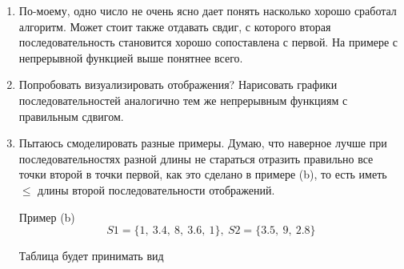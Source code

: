 \documentclass[12pt]{article}
\begin{document}
    \begin{enumerate}
        \item По-моему, одно число не очень ясно дает понять насколько
        хорошо сработал алгоритм. Может стоит также отдавать
        свдиг, с которого вторая последовательность становится
        хорошо сопоставлена с первой. На примере с непрерывной
        функцией выше понятнее всего.

        \item Попробовать визуализировать отображения?
        Нарисовать графики последовательностей аналогично тем же
        непрерывным функциям с правильным сдвигом.
        \item Пытаюсь смоделировать разные примеры. Думаю, что наверное
        лучше при последовательностях разной длины не стараться
        отразить правильно все точки второй в точки первой,
        как это сделано в примере (b), то есть
        иметь $\leq$ длины второй последовательности отображений.

        Пример (b) \[ S1 = \{1,\ 3.4,\ 8,\ 3.6,\ 1\},\ S2 = \{3.5,\ 9,\ 2.8\} \]
        \begin{center}
        \end{center}

        Таблица будет принимать вид



\end{enumerate}
\end{document}
